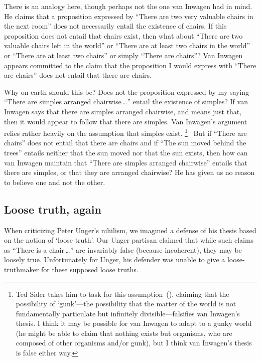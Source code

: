\documentclass[11pt]{article}
\begin{document}
\begin{spacing}{1.5}
There is an analogy here, though perhaps not the one van Inwagen had in mind. He claims that a proposition expressed by ``There are two very valuable chairs in the next room'' does not necessarily entail the existence of chairs. If this proposition does not entail that chairs exist, then what about ``There are two valuable chairs left in the world'' or ``There are at least two chairs in the world'' or ``There are at least two chairs'' or simply ``There are chairs''? Van Inwagen appears committed to the claim that the proposition I would express with ``There are chairs'' does not entail that there are chairs.

Why on earth should this be? Does not the proposition expressed by my saying ``There are simples arranged chairwise\,\ldots '' entail the existence of simples? If van Inwagen says that there are simples arranged chairwise, and means just that, then it would appear to follow that there are simples. Van Inwagen's argument relies rather heavily on the assumption that simples exist.%
%
\footnote{Ted Sider takes him to task for this assumption~(\citeyear{sider1993}), claiming that the possibility of `gunk'---the possibility that the matter of the world is not fundamentally particulate but infinitely divisible---falsifies van Inwagen's thesis. I think it may be possible for van Inwagen to adapt to a gunky world (he might be able to claim that nothing exists but organisms, who are composed of other organisms and/or gunk), but I think van Inwagen's thesis is false either way.}
%
\ But if ``There are chairs'' does not entail that there are chairs and if ``The sun moved behind the trees'' entails neither that the sun moved nor that the sun exists, then how can van Inwagen maintain that ``There are simples arranged chairwise'' entails that there are simples, or that they are arranged chairwise? He has given us no reason to believe one and not the other.

\subsection{Loose truth, again}
\label{loose-v}
When criticizing Peter Unger's nihilism, we imagined a defense of his thesis based on the notion of `loose truth'. Our Unger partisan claimed that while such claims as ``There is a chair\,\ldots '' are invariably false (because incoherent), they may be loosely true. Unfortunately for Unger, his defender was unable to give a loose-truthmaker for these supposed loose truths.


\end{spacing}
\end{document}
